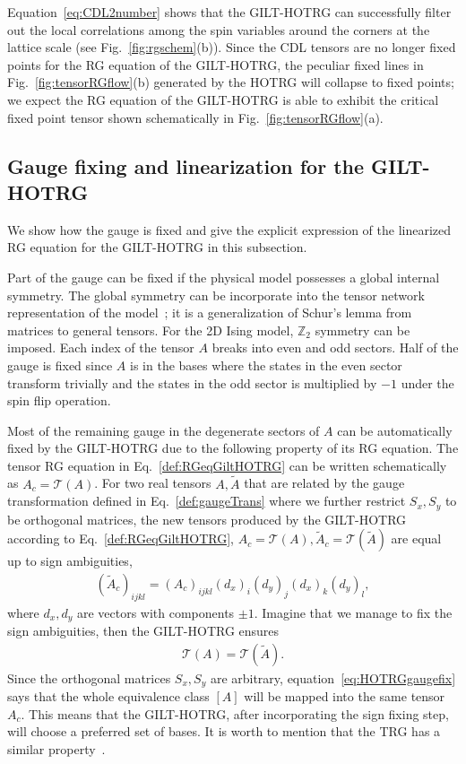 \documentclass[aps,prr,reprint,superscriptaddress,floatfix]{revtex4-2}
\begin{document}
Equation~\eqref{eq:CDL2number} shows that the GILT-HOTRG can successfully filter out the local correlations among the spin variables around the corners at the lattice scale (see Fig.~\ref{fig:rgschem}(b)).
Since the CDL tensors are no longer fixed points for the RG equation of the GILT-HOTRG, the peculiar fixed lines in Fig.~\ref{fig:tensorRGflow}(b) generated by the HOTRG will collapse to fixed points; we expect the RG equation of the GILT-HOTRG is able to exhibit the critical fixed point tensor shown schematically in Fig.~\ref{fig:tensorRGflow}(a).
%

\subsection{Gauge fixing and linearization for the GILT-HOTRG\label{sec:gaugefix}}
We show how the gauge is fixed and give the explicit expression of the linearized RG equation for the GILT-HOTRG in this subsection.
%

Part of the gauge can be fixed if the physical model possesses a global internal symmetry.
The global symmetry can be incorporate into the tensor network representation of the model~\cite{Singh2010SymTen,Singh2011U1Ten,Singh2012SU2Ten}; it is a generalization of Schur's lemma from matrices to general tensors.
For the 2D Ising model, $\mathbb{Z}_2$ symmetry can be imposed.
Each index of the tensor $A$ breaks into even and odd sectors.
Half of the gauge is fixed since $A$ is in the bases where the states in the even sector transform trivially and
the states in the odd sector is multiplied by $-1$ under the spin flip operation.
%

Most of the remaining gauge in the degenerate sectors of $A$ can be automatically fixed by the GILT-HOTRG due to the following property of its RG equation.
The tensor RG equation in Eq.~\eqref{def:RGeqGiltHOTRG} can be written schematically as $A_c = \mathcal{T}\left(A\right)$.
For two real tensors $A, \tilde{A}$ that are related by the gauge transformation defined in Eq.~\eqref{def:gaugeTrans} where we further restrict $S_x,S_y$ to be orthogonal matrices, the new tensors produced by the GILT-HOTRG according to Eq.~\eqref{def:RGeqGiltHOTRG}, $A_c = \mathcal{T}\left(A\right), \tilde{A}_c = \mathcal{T}(\tilde{A})$ are equal up to sign ambiguities,
%
\begin{align}\label{eq:signAmbi}
    \left(\tilde{A}_c \right)_{ijkl} =
    \left(A_c\right)_{ijkl}(d_x)_i (d_y)_j (d_x)_k (d_y)_l, 
\end{align}
%
where $d_x,d_y$ are vectors with components $\pm 1$. 
Imagine that we manage to fix the sign ambiguities, then the GILT-HOTRG ensures
%
\begin{align}\label{eq:HOTRGgaugefix}
    \mathcal{T}(A) = \mathcal{T}(\tilde{A}).
\end{align}
%
Since the orthogonal matrices $S_x, S_y$ are arbitrary, equation~\eqref{eq:HOTRGgaugefix} says that the whole equivalence class $[A]$ will be mapped into the same tensor $A_c$. 
This means that the GILT-HOTRG, after incorporating the sign fixing step, will choose a preferred set of bases. 
It is worth to mention that the TRG has a similar property~\cite{kadanoff2014}.
%
\end{document}
